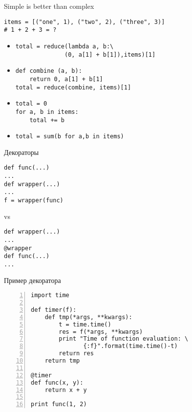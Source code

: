 \documentclass[hyperref={pdftex,unicode}]{beamer}
\begin{document}
\begin{frame}[fragile]{Simple is better than complex}
  \begin{lstlisting}
items = [("one", 1), ("two", 2), ("three", 3)]
# 1 + 2 + 3 = ?
\end{lstlisting}

\begin{itemize}
\item
  \begin{lstlisting}[numbers=right]
total = reduce(lambda a, b:\
              (0, a[1] + b[1]),items)[1]
\end{lstlisting}

\item
\begin{lstlisting}[numbers=right]
def combine (a, b):
    return 0, a[1] + b[1]
total = reduce(combine, items)[1]
\end{lstlisting}

\item
\begin{lstlisting}[numbers=right]
total = 0
for a, b in items:
    total += b
\end{lstlisting}

\item
\begin{lstlisting}[numbers=right]
total = sum(b for a,b in items)
\end{lstlisting}
\end{itemize}
\end{frame}

\begin{frame}[fragile]{Декораторы}
\begin{minipage}{0.4\textwidth}
  \begin{lstlisting}[]
def func(...)
...
def wrapper(...)
...
f = wrapper(func)
  \end{lstlisting}
\end{minipage}
\Large{vs}
\hfill
\begin{minipage}{0.45\textwidth}
  \begin{lstlisting}
def wrapper(...)
...
@wrapper
def func(...)
...
  \end{lstlisting}   
\end{minipage}
\end{frame}

\begin{frame}[fragile]{Пример декоратора}
  \begin{lstlisting}[numbers=left]
import time

def timer(f):
    def tmp(*args, **kwargs):
        t = time.time()
        res = f(*args, **kwargs)
        print "Time of function evaluation: \
               {:f}".format(time.time()-t)
        return res
    return tmp

@timer
def func(x, y):
    return x + y

print func(1, 2)
\end{lstlisting}
\end{frame}
\end{document}
